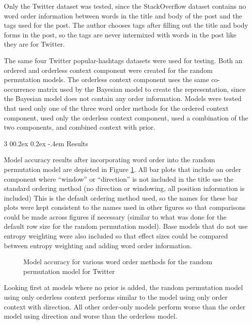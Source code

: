\documentclass[man,floatsintext,donotrepeattitle]{apa6}
\makeatletter
\renewcommand{\subsubsection}{%
  \@startsection
  {subsubsection}%
  {3}%
  {\parindent}%
  {0\baselineskip \@plus 0.2ex \@minus 0.2ex}%
  {-.4em}%
  {\normalfont\normalsize\bfseries\addperi}}
\makeatother
\begin{document}
Only the Twitter dataset was tested, since the StackOverflow dataset contains no word order information between words in the title and body of the post and the tags used for the post.
The author chooses tags after filling out the title and body forms in the post, so the tags are never intermixed with words in the post like they are for Twitter.

The same four Twitter popular-hashtags datasets were used for testing.
Both an ordered and orderless context component were created for the random permutation models.
The orderless context component uses the same co-occurrence matrix used by the Bayesian model to create the representation, since the Bayesian model does not contain any order information.
Models were tested that used only one of the three word order methods for the ordered context component, used only the orderless context component, used a combination of the two components, and combined context with prior. 

\subsubsection{Results}

Model accuracy results after incorporating word order into the random permutation model are depicted in Figure \ref{figContextOrder}.
All bar plots that include an order component where ``window'' or ``direction'' is not included in the title use the standard ordering method (no direction or windowing, all position information is included) 
This is the default ordering method used, so the names for these bar plots were kept consistent to the names used in other figures so that comparisons could be made across figures if necessary
(similar to what was done for the default row size for the random permutation model).
Base models that do not use entropy weighting were also included so that effect sizes could be compared between entropy weighting and adding word order information.

\begin{figure}[!htbp]
  \caption{Model accuracy for various word order methods for the random permutation model for Twitter}
  \label{figContextOrder}
\end{figure}

Looking first at models where no prior is added, the random permutation model using only orderless context performs similar to the model using only order context with direction.
All other order-only models perform worse than the order model using direction and worse than the orderless model.
\end{document}

